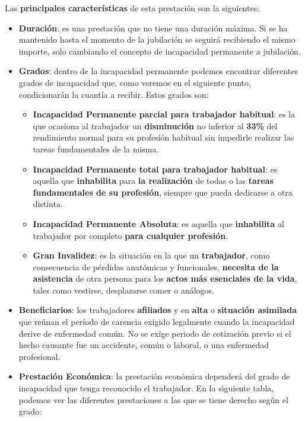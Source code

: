 Las \textbf{principales características} de esta prestación son la siguientes:

\begin{itemize}
    \item \textbf{Duración}: es una prestación que no tiene una duración máxima. Si se ha mantenido hasta el momento de la jubilación se seguirá recibiendo el mismo importe, solo cambiando el concepto de incapacidad permanente a jubilación.

    \item \textbf{Grados}: dentro de la incapacidad permanente podemos encontrar diferentes grados de incapacidad que, como veremos en el siguiente punto, condicionarán la cuantía a recibir. Estos grados son:

    \begin{itemize}
        \item \textbf{Incapacidad Permanente parcial para trabajador habitual}: es la que ocasiona al trabajador un \textbf{disminución} no inferior al \textbf{33\%} del rendimiento normal para su profesión habitual sin impedirle realizar las tareas fundamentales de la misma.
        \item \textbf{Incapacidad Permanente total para trabajador habitual}: es aquella que \textbf{inhabilita} para \textbf{la realización} de todas o las \textbf{tareas fundamentales de su profesión}, siempre que pueda dedicarse a otra distinta.
        \item \textbf{Incapacidad Permanente Absoluta}: es aquella que \textbf{inhabilita} al trabajador por completo \textbf{para cualquier profesión}.
        \item \textbf{Gran Invalidez}: es la situación en la que un \textbf{trabajador}, como consecuencia de pérdidas anatómicas y funcionales, \textbf{necesita de la asistencia} de otra persona para los \textbf{actos más esenciales de la vida}, tales como vestirse, desplazarse comer o análogos.
    \end{itemize}

    \item \textbf{Beneficiarios}: los trabajadores \textbf{afiliados} y en \textbf{alta} o \textbf{situación asimilada} que reúnan el período de carencia exigido legalmente cuando la incapacidad derive de enfermedad común. No se exige periodo de cotización previo si el hecho causante fue un accidente, común o laboral, o una enfermedad profesional.

    \item \textbf{Prestación Económica}: la prestación económica dependerá del grado de incapacidad que tenga reconocido el trabajador. En la siguiente tabla, podemos ver las diferentes prestaciones a las que se tiene derecho según el grado:


\end{itemize}
